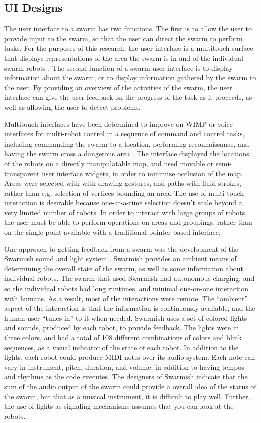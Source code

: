 \subsection{UI Designs}

The user interface to a swarm has two functions. 
The first is to allow the user to provide input to the swarm, so that the user can direct the swarm to perform tasks. 
For the purposes of this research, the user interface is a multitouch surface that displays representations of the area the swarm is in and of the individual swarm robots \cite{micire2009multi}. 
The second function of a swarm user interface is to display information about the swarm, or to display information gathered by the swarm to the user. 
By providing an overview of the activities of the swarm, the user interface can give the user feedback on the progress of the task as it proceeds, as well as allowing the user to detect problems. 

Multitouch interfaces have been determined to improve on WIMP or voice interfaces for multi-robot control in a sequence of command and control tasks, including commanding the swarm to a location, performing reconnaissance, and having the swarm cross a dangerous area \cite{hayes2010multi}.
The interface displayed the locations of the robots on a directly manipulatable map, and used movable or semi-transparent user interface widgets, in order to minimize occlusion of the map. 
Areas were selected with with drawing gestures, and paths with fluid strokes, rather than e.g. selection of vertices bounding an area.
The use of multi-touch interaction is desirable because one-at-a-time selection doesn't scale beyond a very limited number of robots.
In order to interact with large groups of robots, the user must be able to perform operations on areas and groupings, rather than on the single point available with a traditional pointer-based interface. 

One approach to getting feedback from a swarm was the development of the Swarmish sound and light system \cite{mclurkin2006speaking}. 
Swarmish provides an ambient means of determining the overall state of the swarm, as well as some information about individual robots. 
The swarm that used Swarmish had autonomous charging, and so the individual robots had long runtimes, and minimal one-on-one interaction with humans. 
As a result, most of the interactions were remote.
The ``ambient'' aspect of the interaction is that the information is continuously available, and the human user ``tunes in'' to it when needed. 
Swarmish uses a set of colored lights and sounds, produced by each robot, to provide feedback. 
The lights were in three colors, and had a total of 108 different combinations of colors and blink sequences, as a visual indicator of the state of each robot. 
In addition to the lights, each robot could produce MIDI notes over its audio system. 
Each note can vary in instrument, pitch, duration, and volume, in addition to having tempos and rhythms as the code executes. 
The designers of Swarmish indicate that the sum of the audio output of the swarm could provide a overall idea of the status of the swarm, but that as a musical instrument, it is difficult to play well. 
Further, the use of lights as signaling mechanisms assumes that you can look at the robots. 

